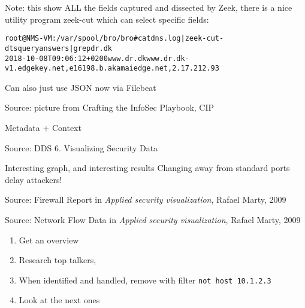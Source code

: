 \documentclass[Screen16to9,17pt]{foils}
\begin{document}
Note: this show ALL the fields captured and dissected by Zeek, there is a nice utility program zeek-cut which can select specific fields:

\begin{alltt}\small
root@NMS-VM:/var/spool/bro/bro# cat dns.log | zeek-cut -d ts query answers | grep dr.dk
2018-10-08T09:06:12+0200	www.dr.dk	www.dr.dk-v1.edgekey.net,e16198.b.akamaiedge.net,2.17.212.93
\end{alltt}

Can also just use JSON now via Filebeat




Source: picture from Crafting the InfoSec Playbook, CIP

Metadata + Context



Source: DDS 6. Visualizing Security Data

\begin{list2}
\item Interesting graph, and interesting results Changing away from standard ports delay attackers!
\end{list2}





Source: Firewall Report in \emph{Applied security visualization}, Rafael Marty, 2009




Source: Network Flow Data in \emph{Applied security visualization}, Rafael Marty, 2009





\begin{quote}

\end{quote}

\begin{enumerate}
\item Get an overview
\item Research top talkers,
\item When identified and handled, remove with filter \verb+not host 10.1.2.3+
\item Look at the next ones
\end{enumerate}
\end{document}
